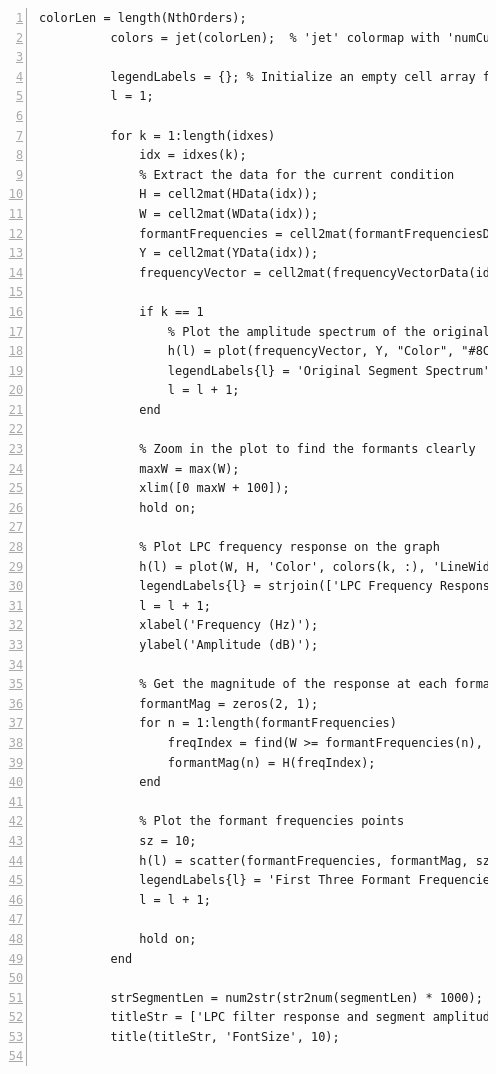 \documentclass{article}
\begin{document}
\begin{lstlisting}[frame=single, numbers=left, style=Matlab-editor, caption={plotExperimentGraph.m}, label={lst:plotExperimentGraph}]
          colorLen = length(NthOrders);
          colors = jet(colorLen);  % 'jet' colormap with 'numCurves' colors
  
          legendLabels = {}; % Initialize an empty cell array for legend labels
          l = 1;
  
          for k = 1:length(idxes)
              idx = idxes(k);
              % Extract the data for the current condition
              H = cell2mat(HData(idx));
              W = cell2mat(WData(idx));
              formantFrequencies = cell2mat(formantFrequenciesData(idx));
              Y = cell2mat(YData(idx));
              frequencyVector = cell2mat(frequencyVectorData(idx));
  
              if k == 1
                  % Plot the amplitude spectrum of the original segment
                  h(l) = plot(frequencyVector, Y, "Color", "#8C92AC");
                  legendLabels{l} = 'Original Segment Spectrum'; % Add label to the legend array
                  l = l + 1;
              end
  
              % Zoom in the plot to find the formants clearly
              maxW = max(W);
              xlim([0 maxW + 100]);
              hold on;
  
              % Plot LPC frequency response on the graph
              h(l) = plot(W, H, 'Color', colors(k, :), 'LineWidth', 1.5);
              legendLabels{l} = strjoin(['LPC Frequency Response, Order:' NthOrders(k)]); % Add label to the legend array
              l = l + 1;
              xlabel('Frequency (Hz)');
              ylabel('Amplitude (dB)');
  
              % Get the magnitude of the response at each formant frequency
              formantMag = zeros(2, 1);
              for n = 1:length(formantFrequencies)
                  freqIndex = find(W >= formantFrequencies(n), 1);
                  formantMag(n) = H(freqIndex);
              end
  
              % Plot the formant frequencies points
              sz = 10;
              h(l) = scatter(formantFrequencies, formantMag, sz, "filled", "o", "MarkerFaceColor", 'k');
              legendLabels{l} = 'First Three Formant Frequencies';
              l = l + 1;
  
              hold on;
          end
  
          strSegmentLen = num2str(str2num(segmentLen) * 1000);
          titleStr = ['LPC filter response and segment amplitude spectrum for ', gender, ' vowel. ', 'Segment Length:', strSegmentLen, 'ms, different Orders'];
          title(titleStr, 'FontSize', 10);
  

\end{lstlisting}
\end{document}

